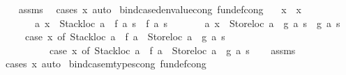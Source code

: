 \begin{isabellebody}
%
\isadelimproof
\ \ %
\endisadelimproof
%
\isatagproof
{}\isamarkupfalse%
\ assms\ \isamarkupfalse%
\ {\isacharparenleft}{\kern0pt}cases\ x{\isacharcomma}{\kern0pt}\ auto{\isacharparenright}{\kern0pt}%
\endisatagproof
{\isafoldproof}%
%
\isadelimproof
\isanewline
%
\endisadelimproof
\isanewline
{}\isamarkupfalse%
\ bind{\isacharunderscore}{\kern0pt}case{\isacharunderscore}{\kern0pt}denvalue{\isacharunderscore}{\kern0pt}cong\ {\isacharbrackleft}{\kern0pt}fundef{\isacharunderscore}{\kern0pt}cong{\isacharbrackright}{\kern0pt}{\isacharcolon}{\kern0pt}\isanewline
\ \ \ {\isachardoublequoteopen}x\ {\isacharequal}{\kern0pt}\ x{\isacharprime}{\kern0pt}{\isachardoublequoteclose}\isanewline
\ \ \ \ \ \ \ {\isachardoublequoteopen}{\isasymAnd}a{\isachardot}{\kern0pt}\ x\ {\isacharequal}{\kern0pt}\ {\isacharparenleft}{\kern0pt}Stackloc\ a{\isacharparenright}{\kern0pt}\ {\isasymLongrightarrow}\ f\ a\ s\ {\isacharequal}{\kern0pt}\ f{\isacharprime}{\kern0pt}\ a\ s{\isachardoublequoteclose}\isanewline
\ \ \ \ \ \ \ {\isachardoublequoteopen}{\isasymAnd}a{\isachardot}{\kern0pt}\ x\ {\isacharequal}{\kern0pt}\ {\isacharparenleft}{\kern0pt}Storeloc\ a{\isacharparenright}{\kern0pt}\ {\isasymLongrightarrow}\ g\ a\ s\ {\isacharequal}{\kern0pt}\ g{\isacharprime}{\kern0pt}\ a\ s{\isachardoublequoteclose}\isanewline
\ \ \ \ \ {\isachardoublequoteopen}{\isacharparenleft}{\kern0pt}case\ x\ of\ {\isacharparenleft}{\kern0pt}Stackloc\ a{\isacharparenright}{\kern0pt}\ {\isasymRightarrow}\ f\ a\ {\isacharbar}{\kern0pt}\ {\isacharparenleft}{\kern0pt}Storeloc\ a{\isacharparenright}{\kern0pt}\ {\isasymRightarrow}\ g\ a{\isacharparenright}{\kern0pt}\ s\isanewline
\ \ \ \ \ \ \ \ \ {\isacharequal}{\kern0pt}\ {\isacharparenleft}{\kern0pt}case\ x{\isacharprime}{\kern0pt}\ of\ {\isacharparenleft}{\kern0pt}Stackloc\ a{\isacharparenright}{\kern0pt}\ {\isasymRightarrow}\ f{\isacharprime}{\kern0pt}\ a\ {\isacharbar}{\kern0pt}\ {\isacharparenleft}{\kern0pt}Storeloc\ a{\isacharparenright}{\kern0pt}\ {\isasymRightarrow}\ g{\isacharprime}{\kern0pt}\ a{\isacharparenright}{\kern0pt}\ s{\isachardoublequoteclose}\isanewline
%
\isadelimproof
\ \ %
\endisadelimproof
%
\isatagproof
{}\isamarkupfalse%
\ assms\ \isamarkupfalse%
\ {\isacharparenleft}{\kern0pt}cases\ x{\isacharcomma}{\kern0pt}\ auto{\isacharparenright}{\kern0pt}%
\endisatagproof
{\isafoldproof}%
%
\isadelimproof
\isanewline
%
\endisadelimproof
\isanewline
{}\isamarkupfalse%
\ bind{\isacharunderscore}{\kern0pt}case{\isacharunderscore}{\kern0pt}mtypes{\isacharunderscore}{\kern0pt}cong\ {\isacharbrackleft}{\kern0pt}fundef{\isacharunderscore}{\kern0pt}cong{\isacharbrackright}{\kern0pt}{\isacharcolon}{\kern0pt}\isanewline

\end{isabellebody}
